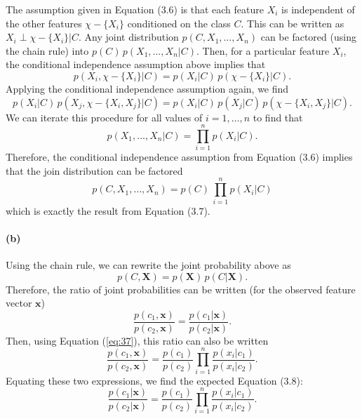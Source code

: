 \documentclass[11pt]{article}
\newcommand{\eq}[1]{Equation (\ref{eq:#1})}
\newcommand{\eqlabel}[1]{\label{eq:#1}}
\newcommand{\pr}[1]{\ensuremath{p(#1)}}
\newcommand{\bvec}[1]{\ensuremath{\boldsymbol{#1}}}
\begin{document}
The assumption given in Equation (3.6) is that each feature $X_i$ is
independent of the other features $\chi - \{X_i\}$ conditioned on the class
$C$. This can be written as $X_i \perp \chi - \{X_i\} | C$. Any joint
distribution $\pr{C, X_1, \ldots, X_n}$ can be factored (using the chain
rule) into $\pr{C} \, \pr{X_1, \ldots, X_n | C}$. Then, for a particular
feature $X_i$, the conditional independence assumption above implies that
\begin{equation}
    \pr{X_i, \chi-\{X_i\} | C} = \pr{X_i|C} \, \pr{\chi-\{X_i\} | C}.
\end{equation}
Applying the conditional independence assumption again, we find
\begin{equation}
    \pr{X_i|C} \, \pr{X_j, \chi-\{X_i, X_j\} | C}
        = \pr{X_i|C} \, \pr{X_j|C} \, \pr{\chi-\{X_i, X_j\} | C}.
\end{equation}
We can iterate this procedure for all values of $i = 1, \ldots, n$ to find
that
\begin{equation}
    \pr{X_1, \ldots, X_n | C} = \prod_{i=1}^{n} \pr{X_i | C}.
\end{equation}
Therefore, the conditional independence assumption from Equation (3.6)
implies that the join distribution can be factored
\begin{equation}\eqlabel{37}
    \pr{C, X_1, \ldots, X_n} = \pr{C} \, \prod_{i=1}^{n} \pr{X_i | C}
\end{equation}
which is exactly the result from Equation (3.7).

\paragraph{(b)}

Using the chain rule, we can rewrite the joint probability above as
\begin{equation}
    \pr{C,\bvec{X}} = \pr{\bvec{X}} \, \pr{C | \bvec{X}}.
\end{equation}
Therefore, the ratio of joint probabilities can be written (for the observed
feature vector \bvec{x})
\begin{equation}
    \frac{\pr{c_1, \bvec{x}}}{\pr{c_2, \bvec{x}}}
        = \frac{\pr{c_1 | \bvec{x}}}{\pr{c_2 | \bvec{x}}}.
\end{equation}
Then, using \eq{37}, this ratio can also be written
\begin{equation}
    \frac{\pr{c_1, \bvec{x}}}{\pr{c_2, \bvec{x}}} = \frac{\pr{c_1}}{\pr{c_2}}
        \prod_{i=1}^{n} \frac{\pr{x_i | c_1}}{\pr{x_i | c_2}}.
\end{equation}
Equating these two expressions, we find the expected Equation (3.8):
\begin{equation}\eqlabel{modcomp}
    \frac{\pr{c_1 | \bvec{x}}}{\pr{c_2 | \bvec{x}}}
    = \frac{\pr{c_1}}{\pr{c_2}}
        \prod_{i=1}^{n} \frac{\pr{x_i | c_1}}{\pr{x_i | c_2}}.
\end{equation}
\end{document}
